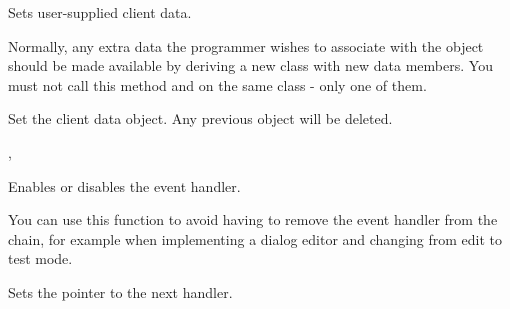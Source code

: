 Sets user-supplied client data.




Normally, any extra data the programmer wishes to associate with 
the object should be made available by deriving a new class
with new data members. You must not call this method and
 on the
same class - only one of them.



\label{wxevthandlersetclientobject}


Set the client data object. Any previous object will be deleted.


,

\label{wxevthandlersetevthandlerenabled}


Enables or disables the event handler.




You can use this function to avoid having to remove the event handler from the chain, for example
when implementing a dialog editor and changing from edit to test mode.



\label{wxevthandlersetnexthandler}


Sets the pointer to the next handler.


